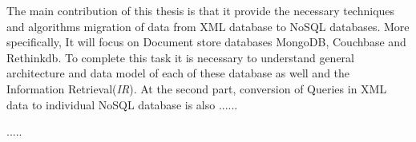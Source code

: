 The main contribution of this thesis is that it provide the necessary techniques and algorithms migration of data from XML database to NoSQL databases.  More specifically, It will focus on Document store databases MongoDB, Couchbase and Rethinkdb. To complete this task it is necessary to understand general architecture and data model of each of these database as well and the Information Retrieval(\textit{IR}).
At the second part, conversion of Queries in XML data to individual NoSQL database is also ......

.....
